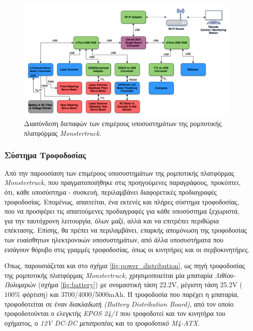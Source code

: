 \begin{figure}[!ht]
	\centering
	\includegraphics[width=1\linewidth]{Chapters/Chapter2/Figures/hardware_interface_diagram.png}
	\caption{Διασύνδεση διεπαφών των επιμέρους υποσυστημάτων της ρομποτικής πλατφόρμας \textit{Monstertruck}.}
	\label{fig:hardware_interface_diagram}
\end{figure}


\bigskip
\subsubsection{Σύστημα Τροφοδοσίας} \label{sssec:power_supply}
Από την παρουσίαση των επιμέρους υποσυστημάτων της ρομποτικής πλατφόρμας \textit{Monstertruck}, που πραγματοποιήθηκε στις προηγούμενες παραγράφους, προκύπτει, ότι, κάθε υποσύστημα - συσκευή, περιλαμβάνει διαφορετικές προδιαγραφές τροφοδοσίας. Επομένως, απαιτείται, ένα εκτενές και πλήρες σύστημα τροφοδοσίας, που να προσφέρει τις απαιτούμενες προδιαγραφές για κάθε υποσύστημα ξεχωριστά, για την ταυτόχρονη λειτουργία, όλων μαζί, αλλά και να επιτρέπει περιθώρια επέκτασης. Επίσης, θα πρέπει να περιλαμβάνει, επαρκής απομόνωση της τροφοδοσίας των ευαίσθητων ηλεκτρονικών υποσυστημάτων, από άλλα υποσυστήματα που εισάγουν θόρυβο στις γραμμές τροφοδοσίας, όπως οι κινητήρες και οι σερβοκινητήρες. 

\bigskip
Όπως, παρουσιάζεται και στο σχήμα \ref{fig:power_distribution}, ως πηγή τροφοδοσίας της ρομποτικής πλατφόρμας \textit{Monstertruck}, χρησιμοποιείται μία μπαταρία \textit{Λιθίου-Πολυμερών} (σχήμα \ref{fig:battery}) με ονομαστική τάση 22.2V, μέγιστη τάση 25.2V ($100\%$ φόρτιση) και 3700/4000/5000mAh. Η τροφοδοσία που παρέχει η μπαταρία, τροφοδοτείται σε έναν \textit{διακλαδωτή (Battery Distribution Board)}, από τον οποίο τροφοδοτούνται ο ελεγκτής \textit{EPOS 24/1} που τροφοδοτεί και τον κινητήρα του οχήματος, ο \textit{12V DC-DC μετατροπέας} και το \textit{τροφοδοτικό M4-ATX}.

